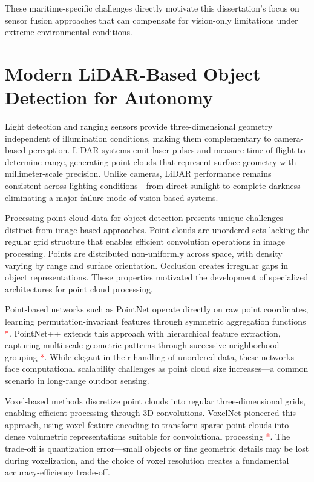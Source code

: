 \documentclass[../main.tex]{subfiles}
\begin{document}
These maritime-specific challenges directly motivate this dissertation's focus on sensor fusion approaches that can compensate for vision-only limitations under extreme environmental conditions.

\section{Modern LiDAR-Based Object Detection for Autonomy}

Light detection and ranging sensors provide three-dimensional geometry independent of illumination conditions, making them complementary to camera-based perception. LiDAR systems emit laser pulses and measure time-of-flight to determine range, generating point clouds that represent surface geometry with millimeter-scale precision. Unlike cameras, LiDAR performance remains consistent across lighting conditions—from direct sunlight to complete darkness—eliminating a major failure mode of vision-based systems.

Processing point cloud data for object detection presents unique challenges distinct from image-based approaches. Point clouds are unordered sets lacking the regular grid structure that enables efficient convolution operations in image processing. Points are distributed non-uniformly across space, with density varying by range and surface orientation. Occlusion creates irregular gaps in object representations. These properties motivated the development of specialized architectures for point cloud processing.

Point-based networks such as PointNet operate directly on raw point coordinates, learning permutation-invariant features through symmetric aggregation functions \textcolor{red}{*}. PointNet++ extends this approach with hierarchical feature extraction, capturing multi-scale geometric patterns through successive neighborhood grouping \textcolor{red}{*}. While elegant in their handling of unordered data, these networks face computational scalability challenges as point cloud size increases—a common scenario in long-range outdoor sensing.

Voxel-based methods discretize point clouds into regular three-dimensional grids, enabling efficient processing through 3D convolutions. VoxelNet pioneered this approach, using voxel feature encoding to transform sparse point clouds into dense volumetric representations suitable for convolutional processing \textcolor{red}{*}. The trade-off is quantization error—small objects or fine geometric details may be lost during voxelization, and the choice of voxel resolution creates a fundamental accuracy-efficiency trade-off.
\end{document}
